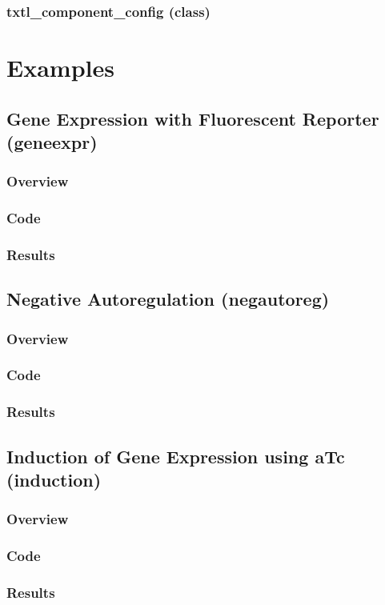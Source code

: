 \documentclass[english]{report}
\begin{document}
		\subsection*{txtl\_component\_config (class)}		

\chapter{Examples}
	\section{Gene Expression with Fluorescent Reporter (geneexpr)}
		\subsection{Overview}
		\subsection{Code}
		\subsection{Results}
	\section{Negative Autoregulation (negautoreg)}
		\subsection{Overview}
		\subsection{Code}
		\subsection{Results}	
	\section{Induction of Gene Expression using aTc (induction)}
		\subsection{Overview}
		\subsection{Code}
		\subsection{Results}	
\end{document}
